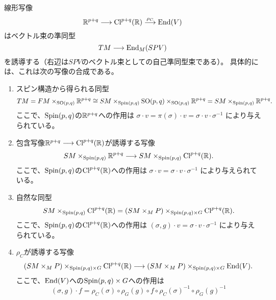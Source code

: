 \begin{dfn}
  \label{dfn:Clifford-multiplication}
  線形写像
  \begin{equation}
    \mathbb{R}^{p+q} \longrightarrow \operatorname{Cl}^{p+q}(\mathbb{R}) \stackrel{\rho_C}{\longrightarrow} \operatorname{End}(V)
  \end{equation}
  はベクトル束の準同型
  \begin{equation}
    TM \longrightarrow \operatorname{End}_M(SPV)
  \end{equation}
  を誘導する（右辺は$SPV$のベクトル束としての自己準同型束である）。
  具体的には、これは次の写像の合成である。
  \begin{enumerate}
    \item
    スピン構造から得られる同型
    \begin{equation}
      TM =
      FM \times_{\operatorname{SO}(p,q)} \mathbb{R}^{p+q} \cong
      SM \times_{\operatorname{Spin}(p,q)} \operatorname{SO}(p,q) \times_{\operatorname{SO}(p,q)} \mathbb{R}^{p+q} =
      SM \times_{\operatorname{Spin}(p,q)} \mathbb{R}^{p+q}.
    \end{equation}
    ここで、$\operatorname{Spin}(p,q)$の$\mathbb{R}^{p+q}$への作用は
    $\sigma \cdot v = \pi(\sigma) \cdot v = \sigma \cdot v \cdot \sigma^{-1}$
    により与えられている。
    \item
    包含写像$\mathbb{R}^{p+q}\longrightarrow\operatorname{Cl}^{p+q}(\mathbb{R})$が誘導する写像
    \begin{equation}
      SM \times_{\operatorname{Spin}(p,q)} \mathbb{R}^{p+q} \longrightarrow
      SM \times_{\operatorname{Spin}(p,q)} \operatorname{Cl}^{p+q}(\mathbb{R}).
    \end{equation}
    ここで、$\operatorname{Spin}(p,q)$の$\operatorname{Cl}^{p+q}(\mathbb{R})$への作用は
    $\sigma \cdot v = \sigma \cdot v \cdot \sigma^{-1}$
    により与えられている。
    \item
    自然な同型
    \begin{equation}
      SM \times_{\operatorname{Spin}(p,q)} \operatorname{Cl}^{p+q}(\mathbb{R}) =
      (SM \times_M P) \times_{\operatorname{Spin}(p,q)\times G} \operatorname{Cl}^{p+q}(\mathbb{R}).
    \end{equation}
    ここで、$\operatorname{Spin}(p,q)$の$\operatorname{Cl}^{p+q}(\mathbb{R})$への作用は
    $(\sigma,g) \cdot v = \sigma \cdot v \cdot \sigma^{-1}$
    により与えられている。
    \item
    $\rho_C$が誘導する写像
    \begin{equation}
      (SM \times_M P) \times_{\operatorname{Spin}(p,q)\times G} \operatorname{Cl}^{p+q}(\mathbb{R}) \longrightarrow
      (SM \times_M P) \times_{\operatorname{Spin}(p,q)\times G} \operatorname{End}(V).
    \end{equation}
    ここで、$\operatorname{End}(V)$への$\operatorname{Spin}(p,q)\times G$への作用は
    \begin{equation}
      (\sigma,g) \cdot f =
      \rho_C(\sigma) \circ \rho_G(g)
      \circ f \circ
      \rho_C(\sigma)^{-1} \circ \rho_G(g)^{-1}

\end{equation}
\end{enumerate}
\end{dfn}
